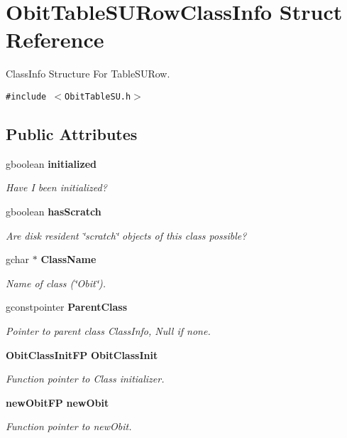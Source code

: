 \section{Obit\-Table\-SURow\-Class\-Info Struct Reference}
\label{structObitTableSURowClassInfo}
Class\-Info Structure For Table\-SURow.  


{\tt \#include $<$Obit\-Table\-SU.h$>$}

\subsection*{Public Attributes}
\begin{CompactItemize}
\item 
gboolean {\bf initialized}
\begin{CompactList}\small\item\em Have I been initialized? \item\end{CompactList}\item 
gboolean {\bf has\-Scratch}
\begin{CompactList}\small\item\em Are disk resident \char`\"{}scratch\char`\"{} objects of this class possible? \item\end{CompactList}\item 
gchar $\ast$ {\bf Class\-Name}
\begin{CompactList}\small\item\em Name of class (\char`\"{}Obit\char`\"{}). \item\end{CompactList}\item 
gconstpointer {\bf Parent\-Class}
\begin{CompactList}\small\item\em Pointer to parent class Class\-Info, Null if none. \item\end{CompactList}\item 
{\bf Obit\-Class\-Init\-FP} {\bf Obit\-Class\-Init}
\begin{CompactList}\small\item\em Function pointer to Class initializer. \item\end{CompactList}\item 
{\bf new\-Obit\-FP} {\bf new\-Obit}
\begin{CompactList}\small\item\em Function pointer to new\-Obit. \item\end{CompactList}\item 

\end{CompactItemize}
